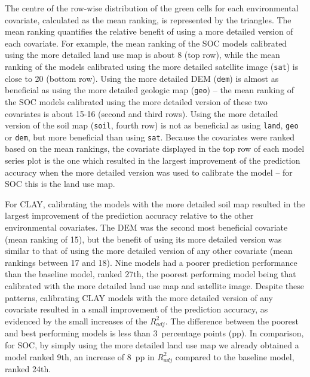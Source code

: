 The centre of the row-wise distribution of the green cells for each environmental covariate, calculated as the 
mean ranking, is represented by the triangles. The mean ranking quantifies the relative benefit of using a 
more detailed version of each covariate. For example, the mean ranking of the SOC models calibrated using the 
more detailed land use map is about 8 (top row), while the mean ranking of the models calibrated using the more 
detailed satellite image (\texttt{sat}) is close to 20 (bottom row). Using the more detailed DEM (\texttt{dem}) 
is almost as beneficial as using the more detailed geologic map (\texttt{geo}) -- the mean ranking of the SOC 
models calibrated using the more detailed version of these two covariates is about 15-16 (second and third 
rows). Using the more detailed version of the soil map (\texttt{soil}, fourth row) is not as beneficial as 
using \texttt{land}, \texttt{geo} or \texttt{dem}, but more beneficial than using \texttt{sat}. Because the 
covariates were ranked based on the mean rankings, the covariate displayed in the top row of each model series 
plot is the one which resulted in the largest improvement of the prediction accuracy when the more detailed 
version was used to calibrate the model -- for SOC this is the land use map.

For CLAY, calibrating the models with the more detailed soil map resulted in the largest improvement of the 
prediction accuracy relative to the other environmental covariates. The DEM was the second most beneficial 
covariate (mean ranking of 15), but the benefit of using its more detailed version was similar to that of using 
the more detailed version of any other covariate (mean rankings between 17 and 18). Nine models had a poorer 
prediction performance than the baseline model, ranked 27th, the poorest performing model being that 
calibrated with the more detailed land use map and satellite image. Despite these patterns, calibrating CLAY 
models with the more detailed version of any covariate resulted in a small improvement of the prediction 
accuracy, as evidenced by the small increases of the ${R}^{2}_{adj}$. The difference between the poorest and 
best performing models is less than 3~percentage points (pp). In comparison, for SOC, by simply using the more 
detailed land use map we already obtained a model ranked 9th, an increase of 8~pp in ${R}^{2}_{adj}$ compared 
to the baseline model, ranked 24th.

